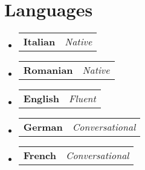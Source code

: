 \documentclass[letterpaper,11pt]{article}
\makeatletter
\newcommand{\resumeProjectHeading}[2]{
    \item
    \begin{tabular*}{0.97\textwidth}{l@{\extracolsep{\fill}}r}
      \small#1 & \textit{#2} \\
    \end{tabular*}\vspace{-7pt}
}
\newcommand{\resumeSubHeadingListStart}{\begin{itemize}[leftmargin=0.15in,rightmargin=1.8in, leftmargin=0.15in, label={}]}
\newcommand{\resumeSubHeadingListEnd}{\end{itemize}}
\makeatother
\begin{document}
%   



\section{Languages}
    \resumeSubHeadingListStart
      \resumeProjectHeading
          {\textbf{Italian}}
          {Native}
      \resumeProjectHeading
          {\textbf{Romanian}}
          {Native}
      \resumeProjectHeading
          {\textbf{English}}
          {Fluent}
      \resumeProjectHeading
          {\textbf{German}}
          {Conversational}
      \resumeProjectHeading
          {\textbf{French}}
          {Conversational}
    \resumeSubHeadingListEnd
\end{document}
